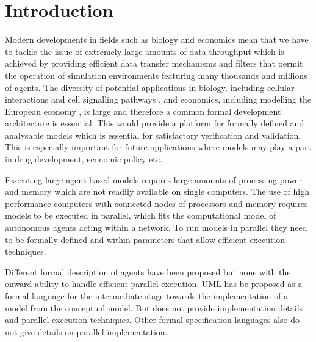\documentclass{aamas2009}
\begin{document}



\section{Introduction}


Modern developments in fields such as biology and economics mean that we have to
tackle the issue of extremely large amounts of data throughput which is achieved
by providing efficient data transfer mechanisms and filters that permit the
operation of simulation environments featuring many thousands and millions of
agents. The diversity of potential applications in biology, including cellular
interactions \cite{3,125} and cell signalling pathways \cite{143}, and economics,
including modelling the European economy \cite{eurace01}, is large and therefore
a common formal development architecture is essential. This would provide a
platform for formally defined and analysable models which is essential for
satisfactory verification and validation. This is especially important for future
applications where models may play a part in drug development, economic policy
etc.

Executing large agent-based models requires large amounts of processing power
and memory which are not readily available on single computers. The use of high
performance computers with connected nodes of processors and memory requires
models to be executed in parallel, which fits the computational model of
autonomous agents acting within a network. To run models in
parallel they need to be formally defined and within parameters that allow
efficient execution techniques.

Different formal description of agents have been proposed but none with the
onward ability to handle efficient parallel execution. UML has be proposed as a
formal language for the intermediate stage towards the implementation of a model from the conceptual model. But does not provide
implementation details and parallel execution techniques.
Other formal specification languages \cite{object-z_statecharts, slabs} also do
not give details on parallel implementation.
\end{document}
